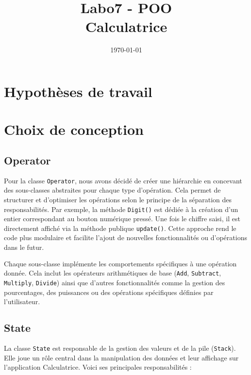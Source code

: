 \documentclass[12pt, a4paper, onecolumn]{article}
\title{Labo7 - POO \\ Calculatrice}
\author{
	\authorstyle{Dani Tiago \largename{Faria dos Santos}\\ Antoine \largename{Aubry } \\ \\ Groupe  \textbf{L02GrP}\\ HEIG-VD} %
}
\date{\today}
\begin{document}
	\twocolumn[ 
	\maketitle
	]
	
	\onecolumn 
	
	\tableofcontents
	\newpage
	
	\section{Hypothèses de travail}
	
	\section{Choix de conception}
\subsection{Operator}

\begin{flushleft}
	Pour la classe \texttt{Operator}, nous avons décidé de créer une hiérarchie en concevant des sous-classes abstraites pour chaque type d'opération. Cela permet de structurer et d'optimiser les opérations selon le principe de la séparation des responsabilités. Par exemple, la méthode \texttt{Digit()} est dédiée à la création d'un entier correspondant au bouton numérique pressé. Une fois le chiffre saisi, il est directement affiché via la méthode publique \texttt{update()}. Cette approche rend le code plus modulaire et facilite l'ajout de nouvelles fonctionnalités ou d'opérations dans le futur.
\linebreak

Chaque sous-classe implémente les comportements spécifiques à une opération donnée. Cela inclut les opérateurs arithmétiques de base (\texttt{Add}, \texttt{Subtract}, \texttt{Multiply}, \texttt{Divide}) ainsi que d'autres fonctionnalités comme la gestion des pourcentages, des puissances ou des opérations spécifiques définies par l'utilisateur.
\end{flushleft}

\subsection{State}

\begin{flushleft}
	La classe \texttt{State} est responsable de la gestion des valeurs et de la pile (\texttt{Stack}). Elle joue un rôle central dans la manipulation des données et leur affichage sur l'application Calculatrice. Voici ses principales responsabilités :
\end{flushleft}
\end{document}
